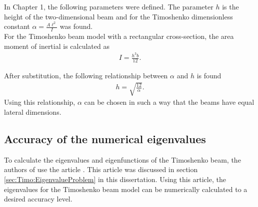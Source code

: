 \documentclass[../../main.tex]{subfiles}
\begin{document}
\begin{figure}[h!]
{{\begin{minipage}[b]{0.8\linewidth}
\begin{center}
				\end{center}
			\end{minipage}
		}
	}
\end{figure}

In Chapter 1, the following parameters were defined. The parameter $h$ is the height of the two-dimensional beam and for the Timoshenko dimensionless constant $\displaystyle \alpha = \frac{A \ell^2}{I}$ was found.\\

For the Timoshenko beam model with a rectangular cross-section, the area moment of inertial is calculated as
\begin{eqnarray*}
	I = \frac{h^3b}{12}.
\end{eqnarray*}

After substitution, the following relationship between $\alpha$ and $h$ is found
\begin{eqnarray*}
	h = \sqrt{\frac{12}{\alpha}}.
\end{eqnarray*}
Using this relationship, $\alpha$ can be chosen in such a way that the beams have equal lateral dimensions.


\subsection{Accuracy of the numerical eigenvalues}
To calculate the eigenvalues and eigenfunctions of the Timoshenko beam, the authors of \cite{LVV09} use the article \cite{VV06}. This article was discussed in section \ref{sec:Timo:EigenvalueProblem} in this dissertation. Using this article, the eigenvalues for the Timoshenko beam model can be numerically calculated to a desired accuracy level. 
\end{document}
